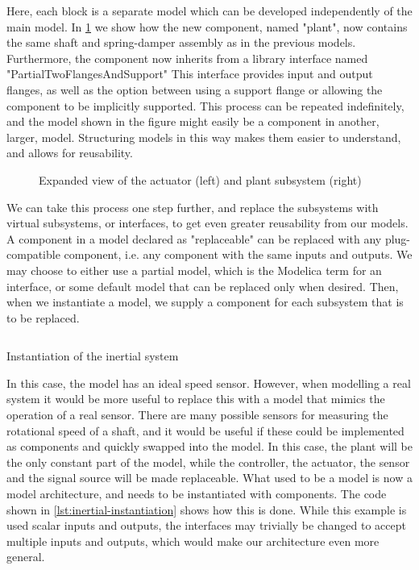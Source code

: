 \documentclass[\rootfolder/main.tex]{subfiles}
\begin{document}
Here, each block is a separate model which can be developed independently of the main model.
In \cref{fig:inertial-architecture-blowup} we show how the new component, named "plant", now contains the same shaft and spring-damper assembly as in the previous models.
Furthermore, the component now inherits from a library interface named "PartialTwoFlangesAndSupport"
This interface provides input and output flanges, as well as the option between using a support flange or allowing the component to be implicitly supported.
This process can be repeated indefinitely, and the model shown in the figure might easily be a component in another, larger, model.
Structuring models in this way makes them easier to understand, and allows for reusability.

\begin{figure}[ht]
    \caption{Expanded view of the actuator (left) and plant subsystem (right)}
    \label{fig:inertial-architecture-blowup}
\end{figure}

We can take this process one step further, and replace the subsystems with virtual subsystems, or interfaces, to get even greater reusability from our models.
A component in a model declared as "replaceable" can be replaced with any plug-compatible component, i.e. any component with the same inputs and outputs.
We may choose to either use a partial model, which is the Modelica term for an interface, or some default model that can be replaced only when desired.
Then, when we instantiate a model, we supply a component for each subsystem that is to be replaced.

\begin{listing}[ht]
    \inputminted[fontsize=\footnotesize]{Modelica}{\rootfolder/Models/MasterProject/Models/InertialImplementation.mo}
    \caption{Instantiation of the inertial system}
    \label{lst:inertial-instantiation}
\end{listing}

In this case, the model has an ideal speed sensor. However, when modelling a real system it would be more useful to replace this with a model that mimics the operation of a real sensor.
There are many possible sensors for measuring the rotational speed of a shaft, and it would be useful if these could be implemented as components and quickly swapped into the model.
In this case, the plant will be the only constant part of the model, while the controller, the actuator, the sensor and the signal source will be made replaceable.
What used to be a model is now a model architecture, and needs to be instantiated with components.
The code shown in \cref{lst:inertial-instantiation} shows how this is done.
While this example is used scalar inputs and outputs, the interfaces may trivially be changed to accept multiple inputs and outputs, which would make our architecture even more general.
\end{document}
